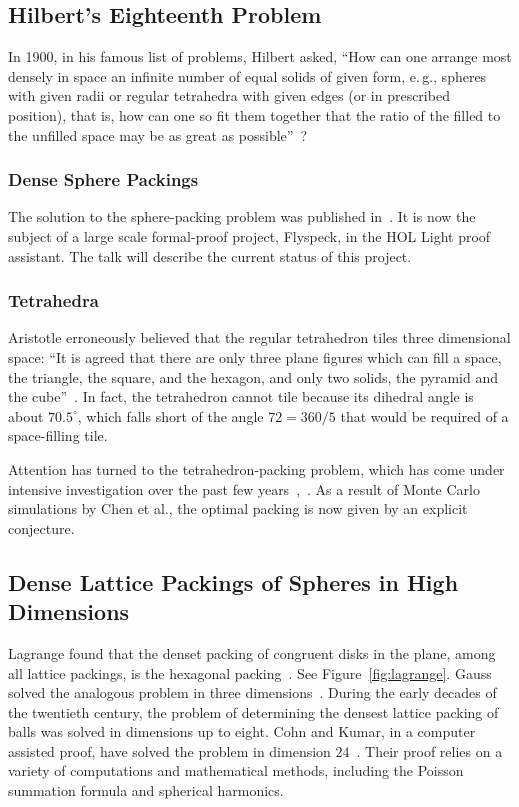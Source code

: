 \subsection*{Hilbert's Eighteenth Problem}


In 1900, in his famous list of problems, Hilbert asked,
``How can one arrange most densely in
space an infinite number of equal solids of given form, e.\,g., spheres
with given radii or regular tetrahedra with given edges (or in
prescribed position), that is, how can one so fit them together that
the ratio of the filled to the unfilled space may be as great as
possible''~\cite{Hilbert}?


\subsubsection*{Dense Sphere Packings}

The solution to the sphere-packing problem was published
in~\cite{Hales:2006:DCG}. It is now the subject of a large scale
formal-proof project, Flyspeck, in the HOL Light proof assistant.
The talk will describe the current status of this project.


\subsubsection*{Tetrahedra}

Aristotle erroneously believed that the regular tetrahedron tiles
  three dimensional space: ``It is agreed that there are only three
  plane figures which can fill a space, the triangle, the square, and
  the hexagon, and only two solids, the pyramid and the
  cube''~\cite{Aristotle}.  In fact, the tetrahedron cannot tile
  because its dihedral angle is about $70.5^\circ$, which falls short
  of the angle $72=360/5$ that would be required of a space-filling
  tile.

Attention has turned to the
tetrahedron-packing problem, which has come under intensive investigation
over the past few years~\cite{Chen-2010},~\cite{Torquato-2010}.  As a
result of Monte Carlo simulations by Chen et al.,  the optimal packing is 
now given by an explicit conjecture.

\subsection*{Dense Lattice Packings of Spheres in High Dimensions}

Lagrange found that the denset packing of congruent disks in the
plane, among all lattice packings, is the hexagonal
packing~\cite{Lagrange}.  See Figure~\ref{fig:lagrange}.
Gauss solved the analogous problem in three
dimensions~\cite{Gau31}.  During the early decades of the twentieth
century, the problem of determining the densest lattice packing of
balls was solved in dimensions up to eight.  Cohn and Kumar, in a
computer assisted proof, have solved the problem in dimension
$24$~\cite{Cohn-Kumar}.  Their proof relies on a variety of
computations and mathematical methods, including the Poisson summation
formula and spherical harmonics. 

